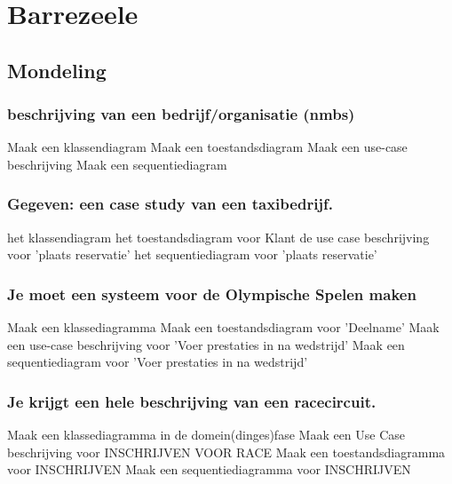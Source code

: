 \section{Barrezeele}

\subsection{Mondeling}

\subsubsection{beschrijving van een bedrijf/organisatie (nmbs)}

\begin{multicols}{2}
\be
\itf Maak een klassendiagram
\itf Maak een toestandsdiagram
\itf Maak een use-case beschrijving
\itf Maak een sequentiediagram
\ee
\end{multicols}

\subsubsection{Gegeven: een case study van een taxibedrijf.}
\begin{multicols}{2}
\be
\itf het klassendiagram
\itf het toestandsdiagram voor Klant
\itf de use case beschrijving voor 'plaats reservatie'
\itf het sequentiediagram voor 'plaats reservatie'
\ee 
\end{multicols}
\subsubsection{Je moet een systeem voor de Olympische Spelen maken}
\begin{multicols}{2}
\be
\itf Maak een klassediagramma
\itf Maak een toestandsdiagram voor 'Deelname'
\itf Maak een use-case beschrijving voor 'Voer prestaties in na wedstrijd'
\itf Maak een sequentiediagram voor 'Voer prestaties in na wedstrijd'
\ee
\end{multicols}
\subsubsection{Je krijgt een hele beschrijving van een racecircuit.}
\begin{multicols}{2}
\be
\itf Maak een klassediagramma in de domein(dinges)fase
\itf Maak een Use Case beschrijving voor INSCHRIJVEN VOOR RACE
\itf Maak een toestandsdiagramma voor INSCHRIJVEN
\itf Maak een sequentiediagramma voor INSCHRIJVEN
\ee
\end{multicols}
